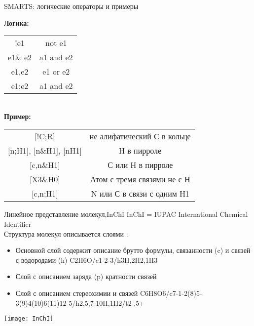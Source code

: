 \begin{frame}{SMARTS: логические операторы и примеры}
    \begin{center}
	\textbf{Логика:} \\
	\vspace{0.5cm}
	\begin{tabular}{c c}
	\hline
	!e1		& not e1\\
	e1{\&} e2	& a1 and e2\\ 
	e1,e2	& e1 or e2\\
	e1;e2	& a1 and e2 \\
		\hline
	\end{tabular}
	\vspace{0.5cm} \\
	\textbf{Пример:} \\
	\vspace{0.5cm}
	\begin{tabular}{c c}
		\hline
{[!C;R]} & не алифатический С в кольце\\
{[n;H1], [n\&H1], [nH1]} & Н в пирроле\\
{[c,n\&H1]} & С или Н в пирроле\\
{[X3\&H0]} & Атом с тремя связями не с Н\\
{[c,n;H1]} & N или С в связи с одним Н1\\
		\hline
	\end{tabular}
\end{center}
\end{frame}

\begin{frame}[fragile]{Линейное представление молекул,InChI  }
  InChI = IUPAC International Chemical Identifier \\
  Структура молекул описывается слоями :
  \begin{itemize}
      \item Основной слой содержит описание брутто формулы, связанности (c) и связей с водородами (h)\newline
          C2H6O/c1-2-3/h3H,2H2,1H3
      \item Слой с описанием заряда (p) кратности связей      
      \item Слой с описанием стереохимии и связей \newline
          C6H8O6/c7-1-2(8)5-3(9)4(10)6(11)12-5/h2,5,7-10H,1H2/t2-,5+
\end{itemize}
\centering \texttt{[image: InChI]}

\end{frame}

